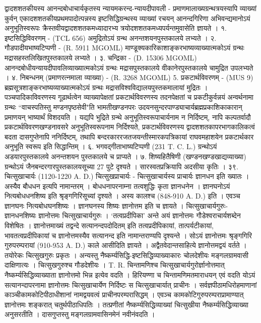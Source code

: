 द्वादशशतकीयस्य आनन्दबोधाचार्यकृतस्य न्यायमकरन्द-न्यायदीपावली - प्रमाणमालाख्यग्रन्थत्रयस्यापि व्याख्यां कुर्वन् एकादशशतकीयप्रथमपादोत्पन्नस्य इष्टसिद्धिग्रन्थस्य व्याख्यां रचयन् आनन्दगिरिणा अभिवन्द्यमानोऽयं अनुभूतिस्वरूपः क्रैस्तवीयद्वादशशतकमध्यादारभ्य त्रयोदशशतकमध्यपर्यन्तमुवासेति ज्ञायते ।
१. इष्टसिद्धिविवरणम् - (TCL 656) अमुद्रितोऽयं ग्रन्थ अनन्तशयनपुस्तकालये लभ्यते ।
२. गौडपादीयभाष्यटिप्पणी - (R. 5911 MGOML)
माण्डूक्यकारिकाशाङ्करभाष्यव्याख्यात्मकोऽयं ग्रन्थः मद्रासहस्तलिखितपुस्तकालये लभ्यते ।
३. चन्द्रिका - (D. 15306 MGOML)
आनन्दबोधीयन्यायदीपावलिव्याख्यात्मकोऽयं ग्रन्थः मद्रासपुस्तकालये वीकानेरपुस्तकालये चामुद्रित उपलभ्यते ।
४. निबन्धनम् (प्रमाणरत्नमाला व्याख्या) - (R. 3268 MGOML)
5. प्रकटार्थविवरणम् - (MUS 9)
ब्रह्मसूत्रशाङ्करभाष्यव्याख्यात्मकोऽयं ग्रन्थः मद्रासविश्वविद्यालयपुस्तकमालायां मुद्रितः । पञ्चपादिकाविवरणस्य गूढार्थत्वेन व्याख्यापेक्षतां प्रकटार्थविवरणस्य तदनपेक्षतां च प्रकटीकुर्वन्नयं अन्वर्थनामा ग्रन्थः ``वाचस्पतिस्तु मण्डनपृष्ठसेवी"ति भामतीखण्डनपरः उदयनसुन्दरपाण्ड्याचार्यब्रह्मप्रकाशिकाकारान् प्रमाणयन् भाष्यार्थं विशदयति ।
यद्यपि भुद्रिते ग्रन्थे अनुभूतिस्वरूपाचार्यनाम न निर्दिष्टम्, नापि कल्पतर्वादौ प्रकटार्थविवरणखण्डनावसरे अनुभूतिस्वरूपनाम निर्दिश्यते, प्रकटार्थविवरणस्य द्वादशशतकापरभागकालिकत्वं बदता दासगुप्तेनापि ननिर्दिष्टम्, तथापि बन्दरकाररजतजयन्तीस्मारकपत्रिकायां राघवमहाशयेन प्रकटार्थकार अनुभूति स्वरूप इति सिद्धान्तिम् ।
६. भगवद्गीताभाष्यटिप्पणी (231 T. C. L.) ग्रन्थोऽयं अडयारपुस्तकालये अनन्तशयन पुस्तकालये च प्राप्यते ।
७. शिष्यहितैषिणी (खण्डनखण्डखाद्यव्याख्या)
ग्रन्थोऽयं जैनबन्दरगारपुस्तकालयसूच्या 27 पुटे दृश्यते । सारस्वतप्रक्रियापि अदसीया कृतिः ।
३९. चित्सुखाचार्यः (1120-1220 A. D.)
चित्सुखप्राचार्यः -
चित्सुखाचार्यस्य प्राचार्यः ज्ञानधन इति ख्यातः । अस्यैव बौधधन इत्यपि नामान्तरम् । बोधधनापरनाम्ना तत्वशुद्धिः कृता ज्ञानधनेन । ज्ञानघनोऽयं नित्यबोधधनशिष्य इति श्रृङ्गगिरिसूच्यां दृश्यते । अस्य कालश्च (848-910 A. D.) इति । एवञ्च ज्ञानघनः नित्यबोधघनशिष्यः । ज्ञानघनस्य शिष्यः ज्ञानोत्तम इति च ज्ञायते ।
चित्सुखाचार्यगुरुः-
ज्ञानधनशिष्यः ज्ञानोत्तमः चित्सुखाचार्यगुरुः । `तत्वप्रदीपिका' अन्ते अयं ज्ञानोत्तमः गौडेश्वराचार्यशब्देन विशेषितः । ज्ञानोत्तमाख्यं तद्वन्दे सत्यानन्दपदोदितम् इति तत्वप्रदीपिकायां, तात्पर्यटीकायां, भावतत्वप्रदीपिकायां च ज्ञानोत्तमस्यैव सत्यानन्द इति नामान्तराण्यपि दृश्यन्ते । सोऽयं ज्ञानोत्तमः श्रृङ्गगिरि गुरुपरम्परायां (910-953 A. D.) काले आसीदिति ज्ञायते ।
अद्वैतवेदान्तसाहित्ये ज्ञानोत्तमद्वयं वर्तते । तयोरेकः चित्सुखगुरुः प्रकृतः । अन्यस्तु नैष्कर्म्यसिद्धि-इष्टसिद्धिव्याख्याकारः चोलदेशीयः मङ्गलग्रामवासी दाक्षिणात्यः । चित्सुखगुरुश्च गौडदेशीयः । T. R. चिन्तामणिश्च चित्सुखाचार्यगुरोर्ज्ञानोत्तमात् नैष्कर्म्यसिद्धिव्याख्याता ज्ञानोत्तमो भिन्न इत्येव वदति । हिरियण्णा च चिन्तामणिमतमाराधयन् एवं वदति योऽयं सत्यानन्दापरनामा ज्ञानोत्तमः चित्सुखाचार्येण निर्दिष्टः स चित्सुखाचार्यात् प्राचीनः । सर्वज्ञपीठामधिरोहमाणानां काञ्चीकामकोटिपीठाधीशानां नामद्वयवत्वं प्राचीनपरम्परासिद्धम् । एवञ्च कामकोटिगुरुपरम्पराप्रामाण्यात् ज्ञानोत्तमः शङ्करात् चतुर्थपीठाधिपतिः । तत्प्रणीतां नैष्कर्म्यसिद्धिव्याख्यां चित्सुखीया नैष्कर्म्यसिद्धिव्याख्या अनुसरतीति । दासगुप्तस्तु मङ्गलग्रामवासिनमेनं नवीनंवदति ।

